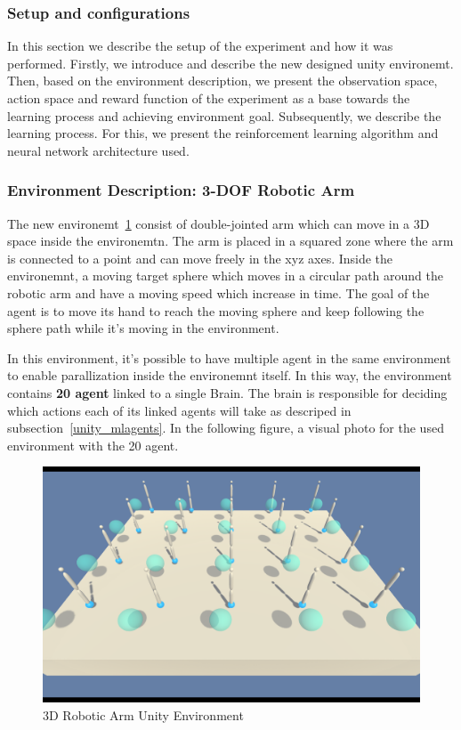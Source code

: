 \subsubsection{Setup and configurations}

In this section we describe the setup of the experiment and how it was performed. Firstly, we introduce and describe the new designed unity environemt. Then, based on the environment description, we present the observation space, action space and reward function of the experiment as a base towards the learning process and achieving environment goal. Subsequently, we describe the learning process. For this, we present the reinforcement learning algorithm and neural network architecture used.


\subsubsection{Environment Description: 3-DOF Robotic Arm}

The new environemt~\ref{fig:unity_environment} consist of double-jointed arm which can move in a 3D space inside the environemtn. The arm is placed in a squared zone where the arm is connected to a point and can move freely in the xyz axes. Inside the environemnt, a moving target sphere which moves in a circular path around the robotic arm and have a moving speed which increase in time. The goal of the agent is to move its hand to reach the moving sphere and keep following the sphere path while it's moving in the environment.

In this environment, it's possible to have multiple agent in the same environment to enable parallization inside the environemnt itself. In this way, the environment contains \textbf{20 agent} linked to a single Brain. The brain is responsible for deciding which actions each of its linked agents will take as descriped in subsection~\ref{unity_mlagents}. In the following figure, a visual photo for the used environment with the 20 agent.

\begin{figure}[!htb]
		\centering
				\includegraphics[width=\linewidth]{figures/envs/unity_reacher_20.png}
				\caption{3D Robotic Arm Unity Environment}
				\label{fig:unity_environment}
\end{figure}

